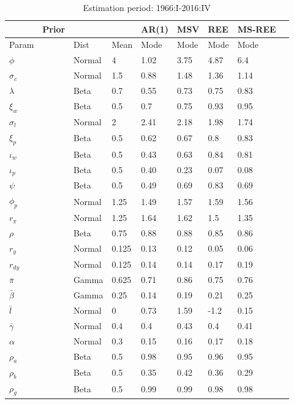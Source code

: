 \documentclass[12pt,reqno]{article}
\numberwithin{equation}{section}
\begin{document}
\begin{table}[H]
\caption{Estimation period: 1966:I-2016:IV}
\label{sw_estimation_full}
\begin{tabular}{llll|ll|lll}
 & Prior &  &  & AR(1) & MSV & REE & MS-REE &  \\
 \hline
 \hline
Param &  & Dist & Mean & Mode & Mode & Mode & Mode &  \\
\hline
\hline
$\phi$ &  & Normal & 4        		& 1.02 & 3.75 & 4.87 & 6.4 \\
$\sigma_c$ &  & Normal & 1.5		& 0.88 & 1.48 & 1.36 & 1.14 \\
$\lambda$ &  & Beta & 0.7 			& 0.55 & 0.73 & 0.75 & 0.83 \\
$\xi_w$ &  & Beta & 0.5 			& 0.7 & 0.75 & 0.93 & 0.95 \\
$\sigma_l$ &  & Normal & 2 			& 2.41 & 2.18 & 1.98 & 1.74 \\
$\xi_p$ &  & Beta & 0.5 			& 0.62 & 0.67 & 0.8 & 0.83 \\
$\iota_w$ &  & Beta & 0.5 			& 0.43 & 0.63 & 0.84 & 0.81 \\
$\iota_p$ &  & Beta & 0.5 			& 0.40 & 0.23 & 0.07 & 0.08 \\
$\psi$ &  & Beta & 0.5 				& 0.49 & 0.69 & 0.83 & 0.69 \\
$\phi_p$ &  & Normal & 1.25 		& 1.49 & 1.57 & 1.59 & 1.56 \\
$r_{\pi}$ &  & Normal & 1.25 		& 1.64 & 1.62 & 1.5 & 1.35 \\
$\rho$ &  & Beta & 0.75 			& 0.88 & 0.88 & 0.85 & 0.86 \\
$r_y$ &  & Normal & 0.125 			& 0.13 & 0.12 & 0.05 & 0.06 \\
$r_{dy}$ &  & Normal & 0.125 		& 0.14 & 0.14 & 0.17 & 0.19 \\
$\bar{\pi}$ &  & Gamma & 0.625 		& 0.71 & 0.86 & 0.75 & 0.76 \\
$\bar{\beta}$ &  & Gamma & 0.25 	& 0.14 & 0.19 & 0.21 & 0.25 \\
$\bar{l}$ &  & Normal & 0 			& 0.73 & 1.59 & -1.2 & 0.15 \\
$\bar{\gamma}$ &  & Normal & 0.4 	& 0.4 & 0.43 & 0.4 & 0.41 \\
$\alpha$ &  & Normal & 0.3 			& 0.15 & 0.16 & 0.17 & 0.18 \\
$\rho_a$ &  & Beta & 0.5 			& 0.98 & 0.95 & 0.96 & 0.95 \\
$\rho_b$ &  & Beta & 0.5 			& 0.35 & 0.42 & 0.36 & 0.29 \\
$\rho_g$ &  & Beta & 0.5 			& 0.99 & 0.99 & 0.98 & 0.98 \\

\end{tabular}
\end{table}
\end{document}
